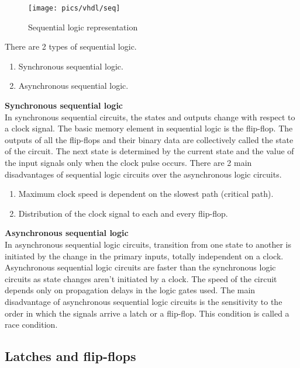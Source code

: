 \pagebreak

\begin{figure}[!h]
	\centering
	\texttt{[image: pics/vhdl/seq]}
	\caption{Sequential logic representation}
	\label{fig:seq}
\end{figure}

\noindent
There are 2 types of sequential logic.
\begin{enumerate}
	\item Synchronous sequential logic.
	\item Asynchronous sequential logic.	
\end{enumerate}

\noindent
\textbf{Synchronous sequential logic}\\

\noindent
In synchronous sequential circuits, the states and outputs change with respect to a clock signal. The basic memory element in sequential logic is the flip-flop. The outputs of all the flip-flops and their binary data are collectively called the state of the circuit. The next state is determined by the current state and the value of the input signals only when the clock pulse occurs. There are 2 main disadvantages of sequential logic circuits over the asynchronous logic circuits.
\begin{enumerate}
	\item Maximum clock speed is dependent on the slowest path (critical path).
	\item Distribution of the clock signal to each and every flip-flop.	
\end{enumerate}

\noindent
\textbf{Asynchronous sequential logic}\\

\noindent
In asynchronous sequential logic circuits, transition from one state to another is initiated by the change in the primary inputs, totally independent on a clock. Asynchronous sequential logic circuits are faster than the synchronous logic circuits as state changes aren't initiated by a clock. The speed of the circuit depends only on propagation delays in the logic gates used. The main disadvantage of asynchronous sequential logic circuits is the sensitivity to the order in which the signals arrive a latch or a flip-flop. This condition is called a race condition.

\pagebreak

\subsection{Latches and flip-flops}

